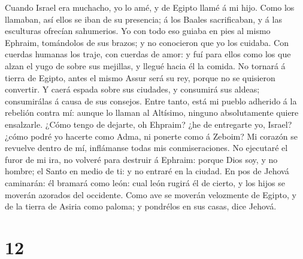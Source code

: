  Cuando Israel era muchacho, yo lo amé, y de Egipto llamé á
mi hijo.  Como los llamaban, así ellos se iban de su
presencia; á los Baales sacrificaban, y á las esculturas ofrecían
sahumerios.  Yo con todo eso guiaba en pies al mismo
Ephraim, tomándolos de sus brazos; y no conocieron que yo los cuidaba.
 Con cuerdas humanas los traje, con cuerdas de amor: y fuí
para ellos como los que alzan el yugo de sobre sus mejillas, y llegué
hacia él la comida.  No tornará á tierra de Egipto, antes el
mismo Assur será su rey, porque no se quisieron convertir. 
Y caerá espada sobre sus ciudades, y consumirá sus aldeas; consumirálas
á causa de sus consejos.  Entre tanto, está mi pueblo
adherido á la rebelión contra mí: aunque lo llaman al Altísimo, ninguno
absolutamente quiere ensalzarle.  ¿Cómo tengo de dejarte, oh
Ehpraim? ¿he de entregarte yo, Israel? ¿cómo podré yo hacerte como Adma,
ni ponerte como á Zeboim? Mi corazón se revuelve dentro de mí,
inflámanse todas mis conmiseraciones.  No ejecutaré el furor
de mi ira, no volveré para destruir á Ephraim: porque Dios soy, y no
hombre; el Santo en medio de ti: y no entraré en la ciudad.
 En pos de Jehová caminarán: él bramará como león: cual
león rugirá él de cierto, y los hijos se moverán azorados del occidente.
 Como ave se moverán velozmente de Egipto, y de la tierra
de Asiria como paloma; y pondrélos en sus casas, dice Jehová.

\hypertarget{section-11}{%
\section{12}\label{section-11}}

